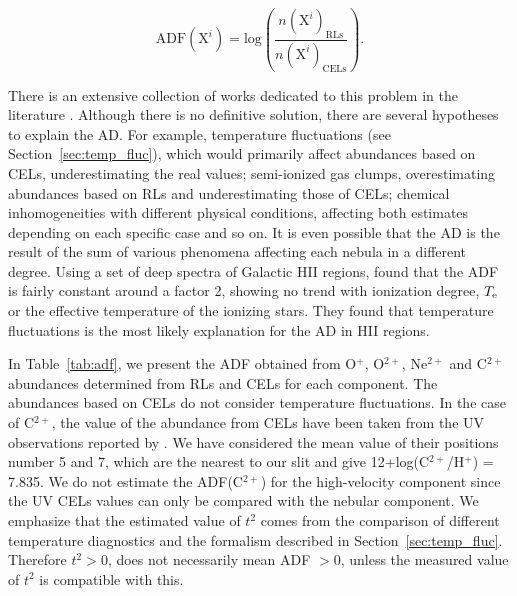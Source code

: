 \documentclass[fleqn,usenatbib]{mnras}
\begin{document}
\begin{equation}
    \label{eq:ADF}
    \text{ADF}\left(\text{X}^{i}\right)=\text{log}\left(\frac{n\left(\text{X}^{i}\right)_{\text{RLs}}}{n\left(\text{X}^{i}\right)_{\text{CELs}}}\right).
\end{equation}

There is an extensive collection of works dedicated to this problem in the literature \citep[see][and references therein]{torrespeimbert80,liu01,stasinska07,garciarojas07,tsamis11,nicholls12,gomezllanos2020}. Although there is no definitive solution, there are several hypotheses to explain the AD. For example, temperature fluctuations (see Section~\ref{sec:temp_fluc}), which would primarily affect abundances based on CELs, underestimating the real values; semi-ionized gas clumps, overestimating abundances based on RLs and underestimating those of CELs; chemical inhomogeneities with different physical conditions, affecting both estimates depending on each specific case and so on. It is even possible that the AD is the result of the sum of various phenomena affecting each nebula in a different degree. Using a set of deep spectra of Galactic  H\thinspace II regions,  \citet{garciarojas07} found that the ADF is fairly constant around a factor 2, showing no trend with ionization degree, $T_{\rm e}$ or the effective temperature of the ionizing stars. They found that temperature fluctuations is the most likely explanation for the AD in H\thinspace II regions. 

In Table~\ref{tab:adf}, we present the ADF obtained from O$^{+}$, O$^{2+}$, Ne$^{2+}$ and C$^{2+}$ abundances determined from RLs and CELs for each component. The abundances based on CELs do not consider temperature fluctuations. In the case of C$^{2+}$, the value of the abundance from CELs have been taken from the UV observations reported by \citet{walter92}. We have considered the mean value of their positions number 5 and 7, which are the nearest to our slit and give 12+log(C$
^{2+}$/H$^+$) = 7.835. We do not estimate the ADF(C$^{2+}$) for the high-velocity component since the UV CELs values can  only be compared with the nebular component. We emphasize that the estimated value of $t^2$ comes from  the comparison of different temperature diagnostics and the formalism described in Section~\ref{sec:temp_fluc}. Therefore $t^2>0$, does not necessarily mean ADF $>0$, unless the measured value of $t^2$ is compatible with this.
\end{document}

